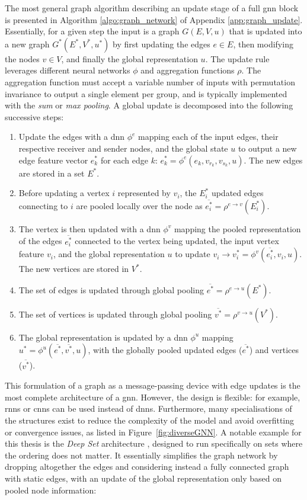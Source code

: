 The most general graph algorithm describing an update stage of a full \gls{gnn} block is presented in Algorithm \ref{algo:graph_network} of Appendix \ref{app:graph_update}. Essentially, for a given step the input is a graph $G(E, V, u)$ that is updated into a new graph $G^*(E^*, V^*, u^*)$ by first updating the edges $e \in E$, then modifying the nodes $v \in V$, and finally the global representation $u$. The update rule leverages different neural networks $\phi$ and aggregation functions $\rho$. The aggregation function must accept a variable number of inputs with permutation invariance to output a single element per group, and is typically implemented with the \textit{sum} or \textit{max pooling}. A global update is decomposed into the following successive steps: 
\begin{enumerate}
    \item Update the edges with a \gls{dnn} $\phi^e$ mapping each of the input edges, their respective receiver and sender nodes, and the global state $u$ to output a new edge feature vector $e^*_k$ for each edge $k$: $e^*_k = \phi^e(e_k, v_{r_k}, v_{s_k}, u)$. The new edges are stored in a set $E^*$. 
    \item Before updating a vertex $i$ represented by $v_i$, the $E_i^*$ updated edges connecting to $i$ are pooled locally over the node as $\overline{e^*_i} = \rho^{e \rightarrow v}(E_i^*)$.
    \item The vertex is then updated with a \gls{dnn} $\phi^v$ mapping the pooled representation of the edges $\overline{e^*_i}$ connected to the vertex being updated, the input vertex feature $v_i$, and the global representation $u$ to update $v_i \rightarrow v^*_i = \phi^v(\overline{e^*_i}, v_i, u)$. The new vertices are stored in $V^*$.
    \item The set of edges is updated through global pooling $\overline{e^*} = \rho^{e \rightarrow u}(E^*)$.
    \item The set of vertices is updated through global pooling $\overline{v^*} = \rho^{v \rightarrow u}(V^*)$.
    \item The global representation is updated by a \gls{dnn} $\phi^u$ mapping $u^* = \phi^u(\overline{e^*}, \overline{v^*}, u)$, with the globally pooled updated edges ($\overline{e^*}$) and vertices ($\overline{v^*}$). 
\end{enumerate} 
This formulation of a graph as a message-passing device with edge updates is the most complete architecture of a \gls{gnn}. However, the design is flexible: for example, \glspl{rnn} or \glspl{cnn} can be used instead of \glspl{dnn}. Furthermore, many specialisations of the structures exist to reduce the complexity of the model and avoid overfitting or convergence issues, as listed in Figure~\ref{fig:diverseGNN}. A notable example for this thesis is the \textit{Deep Set} architecture \cite{NIPS2017f22e4747}, designed to run specifically on sets where the ordering does not matter. It essentially simplifies the graph network by dropping altogether the edges and considering instead a fully connected graph with static edges, with an update of the global representation only based on pooled node information: 
